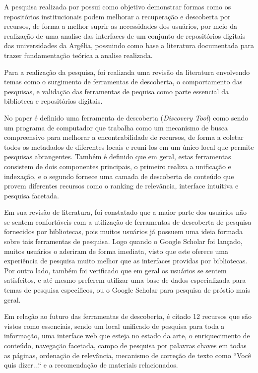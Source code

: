 A pesquisa realizada por \cite{Mettai:2019} possui como objetivo demonstrar
formas como os repositórios institucionais podem melhorar a recuperação e
descoberta por recursos, de forma a melhor suprir as necessidades dos usuários,
por meio da realização de uma analise das interfaces de um conjunto
de repositórios digitais das universidades da Argélia, possuindo como base
a literatura documentada para trazer fundamentação teórica a analise realizada.

Para a realização da pesquisa, foi realizada uma revisão da literatura
envolvendo temas como o surgimento de ferramentas de descoberta, o comportamento
das pesquisas, e validação das ferramentas de pequisa como parte essencial da
biblioteca e repositórios digitais.

No paper é definido uma ferramenta de descoberta (\emph{Discovery Tool}) como
sendo um programa de computador que trabalha como um mecanismo de busca
compreensivo para melhorar a encontrabilidade de recursos, de forma a coletar
todos os metadados de diferentes locais e reuni-los em um único local que
permite pesquisas abrangentes. Também é definido que em geral, estas ferramentas
consistem de dois componentes principais, o primeiro realiza a unificação
e indexação, e o segundo fornece uma camada de descoberta de conteúdo que
provem diferentes recursos como o ranking de relevância, interface intuitiva
e pesquisa facetada.

Em sua revisão de literatura, foi constatado que a maior parte dos usuários
não se sentem confortáveis com a utilização de ferramentas de descoberta de
pesquisa fornecidos por bibliotecas, pois muitos usuários já possuem uma ideia
formada sobre tais ferramentas de pesquisa. Logo quando o Google Scholar
foi lançado, muitos usuários o aderiram de forma imediata, visto que este oferece
uma experiência de pesquisa muito melhor que as interfaces providas por bibliotecas.
Por outro lado, também foi verificado que em geral os usuários se sentem
satisfeitos, e até mesmo preferem utilizar uma base de dados especializada
para temas de pesquisa específicos, ou o Google Scholar para pesquisa de
próstio mais geral.

Em relação ao futuro das ferramentas de descoberta,
é citado 12 recursos que são vistos como essenciais, sendo um local
unificado de pesquisa para toda a informação, uma interface web
que esteja no estado da arte, o enriquecimento de conteúdo, navegação
facetada, campo de pesquisa por palavras chaves em todas as páginas,
ordenação de relevância, mecanismo de correção de texto como ``Você quis dizer...``
e a recomendação de materiais relacionados.

